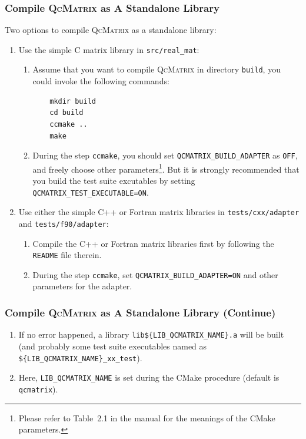 \documentclass[10pt]{beamer}
\begin{document}
{{\begin{frame}[fragile]
  \frametitle<presentation>{Compile \textsc{QcMatrix} as A Standalone Library}
  Two options to compile \textsc{QcMatrix} as a standalone library:
  \begin{enumerate}
    \item Use the simple C matrix library in \verb|src/real_mat|:
    \begin{enumerate}
      \item Assume that you want to compile \textsc{QcMatrix} in directory
        \verb|build|, you could invoke the following commands:
        \begin{verbatim}
    mkdir build
    cd build
    ccmake ..
    make
        \end{verbatim}
      \vspace*{-2ex}
      \item During the step \verb|ccmake|, you should set \verb|QCMATRIX_BUILD_ADAPTER|
        as \verb|OFF|, and freely choose other parameters\footnote{Please refer to
        Table~2.1 in the manual for the meanings of the CMake parameters.}. But
        it is strongly recommended that you build the test suite excutables by
        setting \verb|QCMATRIX_TEST_EXECUTABLE=ON|.
    \end{enumerate}
    \item Use either the simple C++ or Fortran matrix libraries in
      \verb|tests/cxx/adapter| and \verb|tests/f90/adapter|:
    \begin{enumerate}
      \item Compile the C++ or Fortran matrix libraries first by following the
        \verb|README| file therein.
      \item During the step \verb|ccmake|, set \verb|QCMATRIX_BUILD_ADAPTER=ON|
        and other parameters for the adapter.
    \end{enumerate}
  \end{enumerate}
\end{frame}

\begin{frame}[fragile]
  \frametitle<presentation>{Compile \textsc{QcMatrix} as A Standalone Library (Continue)}
  \begin{enumerate}
    \item If no error happened, a library \verb|lib${LIB_QCMATRIX_NAME}.a| will
      be built (and probably some test suite executables named as
      \verb|${LIB_QCMATRIX_NAME}_xx_test|).
    \item Here, \verb|LIB_QCMATRIX_NAME| is set during the CMake procedure (default
      is \verb|qcmatrix|).
  \end{enumerate}
\end{frame}

}}
\end{document}
